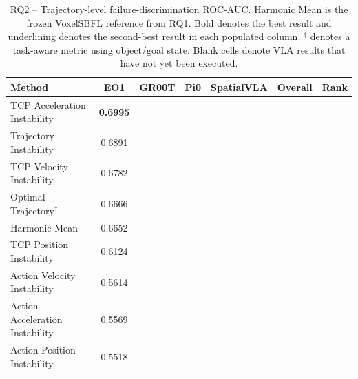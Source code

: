 \begin{table}[t]
\centering
\caption{RQ2 -- Trajectory-level failure-discrimination ROC-AUC. Harmonic Mean is the frozen VoxelSBFL reference from RQ1. Bold denotes the best result and underlining denotes the second-best result in each populated column. $^{\dagger}$ denotes a task-aware metric using object/goal state. Blank cells denote VLA results that have not yet been executed.}
\label{tab:rq2-baseline-performance}
{\scriptsize
\setlength{\tabcolsep}{4pt}
\begin{tabular}{lcccccc}
\toprule
Method & EO1 & GR00T & Pi0 & SpatialVLA & Overall & Rank \\
\midrule
TCP Acceleration Instability & \textbf{0.6995} &  &  &  &  &  \\
Trajectory Instability & \underline{0.6891} &  &  &  &  &  \\
TCP Velocity Instability & 0.6782 &  &  &  &  &  \\
Optimal Trajectory$^{\dagger}$ & 0.6666 &  &  &  &  &  \\
Harmonic Mean & 0.6652 &  &  &  &  &  \\
TCP Position Instability & 0.6124 &  &  &  &  &  \\
Action Velocity Instability & 0.5614 &  &  &  &  &  \\
Action Acceleration Instability & 0.5569 &  &  &  &  &  \\
Action Position Instability & 0.5518 &  &  &  &  &  \\
\bottomrule
\end{tabular}
}
\end{table}
